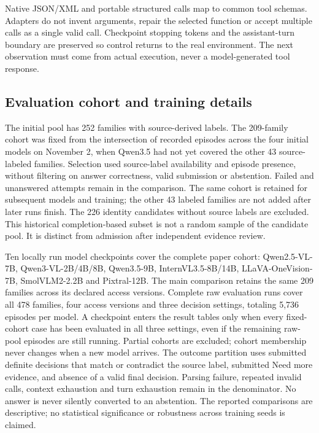 Native JSON/XML and portable structured calls map to common tool schemas.
Adapters do not invent arguments, repair the selected function or accept multiple calls as a single valid call.
Checkpoint stopping tokens and the assistant-turn boundary are preserved so control returns to the real environment.
The next observation must come from actual execution, never a model-generated tool response.

\subsection{Evaluation cohort and training details}
The initial pool has 252 families with source-derived labels.
The 209-family cohort was fixed from the intersection of recorded episodes across the four initial models on November 2, when Qwen3.5 had not yet covered the other 43 source-labeled families.
Selection used source-label availability and episode presence, without filtering on answer correctness, valid submission or abstention.
Failed and unanswered attempts remain in the comparison.
The same cohort is retained for subsequent models and training; the other 43 labeled families are not added after later runs finish.
The 226 identity candidates without source labels are excluded.
This historical completion-based subset is not a random sample of the candidate pool.
It is distinct from admission after independent evidence review.

Ten locally run model checkpoints cover the complete paper cohort: Qwen2.5-VL-7B, Qwen3-VL-2B/4B/8B, Qwen3.5-9B, InternVL3.5-8B/14B, LLaVA-OneVision-7B, SmolVLM2-2.2B and Pixtral-12B.
The main comparison retains the same 209 families across its declared access versions.
Complete raw evaluation runs cover all 478 families, four access versions and three decision settings, totaling 5,736 episodes per model.
A checkpoint enters the result tables only when every fixed-cohort case has been evaluated in all three settings, even if the remaining raw-pool episodes are still running. Partial cohorts are excluded; cohort membership never changes when a new model arrives.
The outcome partition uses submitted definite decisions that match or contradict the source label, submitted Need more evidence, and absence of a valid final decision.
Parsing failure, repeated invalid calls, context exhaustion and turn exhaustion remain in the denominator.
No answer is never silently converted to an abstention.
The reported comparisons are descriptive; no statistical significance or robustness across training seeds is claimed.

